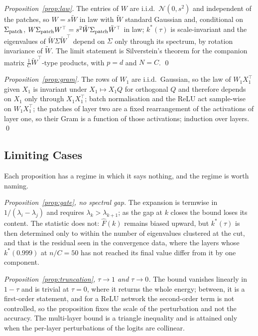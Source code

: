 \documentclass[10pt,journal,compsoc]{IEEEtran}
\begin{document}
\emph{Proposition~\ref{prop:law}.} The entries of $W$ are i.i.d.\ $\mathcal{N}(0, s^2)$ and independent of the patches, so $W = s\tilde W$ in law with $\tilde W$ standard Gaussian and, conditional on $\Sigma_{\rm patch}$, $W\Sigma_{\rm patch}W^{\top} = s^2 \tilde W \Sigma_{\rm patch} \tilde W^{\top}$ in law; $k^*(\tau)$ is scale-invariant and the eigenvalues of $\tilde W \Sigma \tilde W^{\top}$ depend on $\Sigma$ only through its spectrum, by rotation invariance of $\tilde W$. The limit statement is Silverstein's theorem \cite{silverstein1995strong} for the companion matrix $\frac{1}{C}\tilde W^{\top}$-type products, with $p = d$ and $N = C$. \qed


\emph{Proposition~\ref{prop:gram}.} The rows of $W_1$ are i.i.d.\ Gaussian, so the law of $W_1 X_1^{\top}$ given $X_1$ is invariant under $X_1 \mapsto X_1 Q$ for orthogonal $Q$ and therefore depends on $X_1$ only through $X_1 X_1^{\top}$; batch normalisation and the ReLU act sample-wise on $W_1 X_1^{\top}$; the patches of layer two are a fixed rearrangement of the activations of layer one, so their Gram is a function of those activations; induction over layers. \qed

\subsection*{Limiting Cases}

Each proposition has a regime in which it says nothing, and the regime is worth naming.

\emph{Proposition~\ref{prop:gate}, no spectral gap.} The expansion is termwise in $1/(\lambda_i - \lambda_j)$ and requires $\lambda_k > \lambda_{k+1}$; as the gap at $k$ closes the bound loses its content. The statistic does not: $\hat F(k)$ remains biased upward, but $k^*(\tau)$ is then determined only to within the number of eigenvalues clustered at the cut, and that is the residual seen in the convergence data, where the layers whose $k^*(0.999)$ at $n/C = 50$ has not reached its final value differ from it by one component.

\emph{Proposition~\ref{prop:truncation}, $\tau \to 1$ and $\tau \to 0$.} The bound vanishes linearly in $1 - \tau$ and is trivial at $\tau = 0$, where it returns the whole energy; between, it is a first-order statement, and for a ReLU network the second-order term is not controlled, so the proposition fixes the scale of the perturbation and not the accuracy. The multi-layer bound is a triangle inequality and is attained only when the per-layer perturbations of the logits are collinear.
\end{document}
